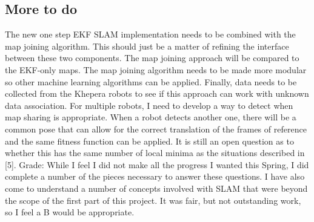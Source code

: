 \documentclass[12pt]{article}
\begin{document}
\subsection{More to do}
The new one step EKF SLAM implementation needs to be combined with the map joining algorithm.  This should just be a matter of refining the interface between these two components.  The map joining approach will be compared to the EKF-only maps.  The map joining algorithm needs to be made more modular so other machine learning algorithms can be applied.  Finally, data needs to be collected from the Khepera robots to see if this approach can work with unknown data association.  
For multiple robots, I need to develop a way to detect when map sharing is appropriate.  When a robot detects another one, there will be a common pose that can allow for the correct translation of the frames of reference and the same fitness function can be applied.  It is still an open question as to whether this has the same number of local minima as the situations described in [5].
Grade:
While I feel I did not make all the progress I wanted this Spring, I did complete a number of the pieces necessary to answer these questions.  I have also come to understand a number of concepts involved with SLAM that were beyond the scope of the first part of this project.  It was fair, but not outstanding work, so I feel a B would be appropriate.

{}

\end{document}

